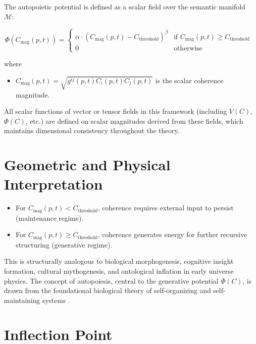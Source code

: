 The autopoietic potential is defined as a scalar field over the semantic manifold \(\mathcal{M}\):

\begin{equation}
\Phi(C_{\mathrm{mag}}(p,t)) =
\begin{cases}
\alpha \cdot (C_{\mathrm{mag}}(p,t) - C_{\text{threshold}})^{\beta} & \text{if } C_{\mathrm{mag}}(p,t) \geq C_{\text{threshold}} \\
0 & \text{otherwise}
\end{cases}
\end{equation}

where

\begin{itemize}
    \item \(C_{\mathrm{mag}}(p,t) = \sqrt{g^{ij}(p,t) C_i(p,t) C_j(p,t)}\) is the scalar coherence magnitude.
\end{itemize}

All scalar functions of vector or tensor fields in this framework (including \(V(C)\), \(\Phi(C)\), etc.) are defined on scalar magnitudes derived from these fields, which maintains dimensional consistency throughout the theory.

\section{Geometric and Physical Interpretation}

\begin{itemize}
    \item For \(C_{\mathrm{mag}}(p,t) < C_{\text{threshold}}\), coherence requires external input to persist (maintenance regime).
    \item For \(C_{\mathrm{mag}}(p,t) \geq C_{\text{threshold}}\), coherence generates energy for further recursive structuring (generative regime).
\end{itemize}

This is structurally analogous to biological morphogenesis, cognitive insight formation, cultural mythogenesis, and ontological inflation in early universe physics. The concept of autopoiesis, central to the generative potential \(\Phi(C)\), is drawn from the foundational biological theory of self-organizing and self-maintaining systems \autocite{MaturanaVarela1980}.

\section{Inflection Point}

